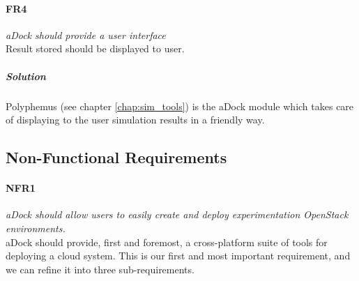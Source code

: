 \paragraph{FR4}\label{p:fr4} \emph{aDock should provide a user interface} \hfill \\
Result stored should be displayed to user.
\subparagraph{Solution} Polyphemus (see chapter \ref{chap:sim_tools}) is the aDock module which takes care of displaying to the user simulation results in a friendly way.

\subsection{Non-Functional Requirements}
\label{sub:nonfunc_req}

\paragraph{NFR1}\label{p:nfr1} \emph{aDock should allow users to easily create and deploy experimentation OpenStack environments.} \hfill \\
 aDock should provide, first and foremost, a cross-platform suite of tools for deploying a cloud system. This is our first and most important requirement, and  we can refine it into three sub-requirements.

